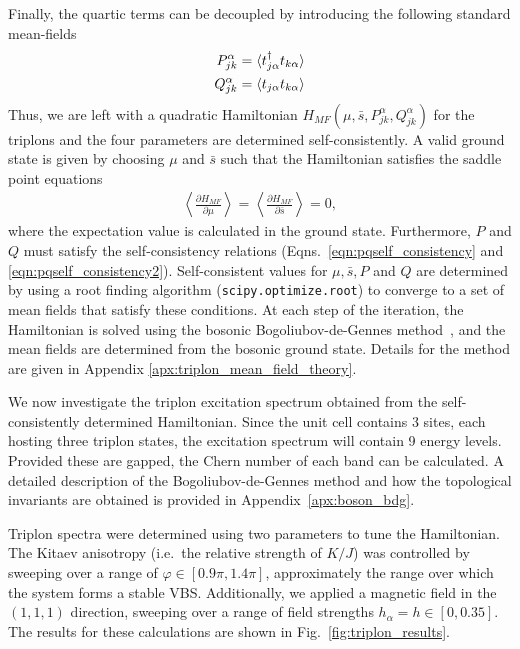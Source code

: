 Finally, the quartic terms can be decoupled by introducing the following standard mean-fields
\begin{align} \label{eqn:pqself_consistency}
    P_{jk}^\alpha &= \braket{t_{j\alpha}^\dag t_{k\alpha}} 
    \\ \label{eqn:pqself_consistency2}
    Q _{jk}^\alpha &= \braket{t_{j\alpha} t_{k\alpha}}
\end{align}
Thus, we are left with a quadratic Hamiltonian $H_{MF}(\mu, \bar s, P^\alpha_{jk} , Q^\alpha_{jk} )$ for the triplons  and the four parameters are determined self-consistently. A valid ground state is given by choosing $\mu$ and $\bar s$ such that the Hamiltonian satisfies the saddle point equations
\begin{align} \label{eqn:triplon_saddle_point}
    \left \langle
        \frac
        {\partial H_{MF}}
        {\partial \mu} 
    \right \rangle
    =
    \left \langle
        \frac
        {\partial H_{MF}}
        {\partial \bar s} 
    \right \rangle
    =0,
\end{align}
where the expectation value is calculated in the ground state. Furthermore, $P$ and $Q$ must satisfy the self-consistency relations (Eqns.~\ref{eqn:pqself_consistency} and \ref{eqn:pqself_consistency2}). Self-consistent values for $\mu, \bar s, P$ and $Q$ are determined by using a root finding algorithm (\texttt{scipy.optimize.root}) to converge to a set of mean fields that satisfy these conditions. At each step of the iteration, the Hamiltonian is solved using the bosonic Bogoliubov-de-Gennes method~\cite{blaizot_quantum_1986}, and the mean fields are determined from the bosonic ground state. Details for the method are given in Appendix \ref{apx:triplon_mean_field_theory}.

We now investigate the triplon excitation spectrum obtained from the self-consistently determined Hamiltonian. Since the unit cell contains 3 sites, each hosting three triplon states, the excitation spectrum will contain 9 energy levels. Provided these are gapped, the Chern number of each band can be calculated. A detailed description of the Bogoliubov-de-Gennes method and how the topological invariants are obtained is provided in Appendix~\ref{apx:boson_bdg}.

Triplon spectra were determined using two parameters to tune the Hamiltonian. The Kitaev anisotropy (i.e.~the relative strength of $K/J$) was controlled by sweeping over a range of $\varphi \in [0.9\pi, 1.4\pi]$, approximately the range over which the system forms a stable VBS. Additionally, we applied a magnetic field in the $(1,1,1)$ direction, sweeping over a range of field strengths $h_{\alpha} = h \in [0,0.35]$. The results for these calculations are shown in Fig.~\ref{fig:triplon_results}. 


